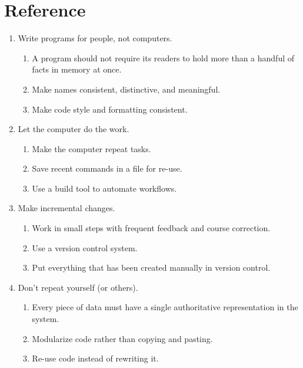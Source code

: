 \documentclass{article}
\begin{document}



\pagebreak

\section*{Reference}

{\footnotesize
\begin{enumerate}

\item Write programs for people, not computers.
  \begin{enumerate}
  \item A program should not require its readers to hold more than a handful of facts in memory at once.
  \item Make names consistent, distinctive, and meaningful.
  \item Make code style and formatting consistent.
  \end{enumerate}

\item Let the computer do the work.
  \begin{enumerate}
  \item Make the computer repeat tasks.
  \item Save recent commands in a file for re-use.
  \item Use a build tool to automate workflows.
  \end{enumerate}

\item Make incremental changes.
  \begin{enumerate}
  \item Work in small steps with frequent feedback and course correction.
  \item Use a version control system.
  \item Put everything that has been created manually in version control.
  \end{enumerate}

\item Don't repeat yourself (or others).
  \begin{enumerate}
  \item Every piece of data must have a single authoritative representation in the system.
  \item Modularize code rather than copying and pasting.
  \item Re-use code instead of rewriting it.
  \end{enumerate}


\end{enumerate}}
\end{document}
